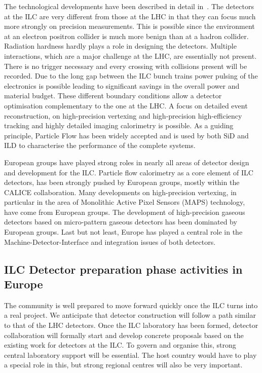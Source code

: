 \documentclass[%
 reprint,
 floatfix,
 amsmath,amssymb,
 aps,
]{revtex4-1}
\begin{document}
The technological developments have been described in detail in~\cite{ILCforESS}. 
The detectors at the ILC are very different from those at the LHC in that they 
can focus much more strongly on precision measurements. This is possible since 
the environment at an electron positron collider is much more benign than at a 
hadron collider. Radiation hardness hardly plays a role in designing the 
detectors. Multiple interactions, which are a major challenge at the LHC, are 
essentially not present. There is no trigger necessary and every crossing with collisions present will be recorded. Due to the long gap between the ILC bunch trains power pulsing of the electronics is possible leading to significant savings in the overall power and material budget.
These different boundary conditions allow a detector 
optimisation complementary to the one at the LHC. A focus on detailed event 
reconstruction, on high-precision vertexing and high-precision high-efficiency 
tracking and highly detailed imaging calorimetry is possible. As a guiding 
principle, Particle Flow has been widely accepted and is used by both SiD and ILD 
to characterise the performance of the complete systems. 

European groups have played strong roles in nearly all areas of detector design 
and development for the ILC. Particle flow calorimetry as a core element of ILC detectors,  
has been strongly pushed by European groups, mostly within the CALICE collaboration. Many developments on 
high-precision vertexing, in particular in the area of Monolithic Active Pixel 
Sensors (MAPS) technology, have come from European groups. The development of 
high-precision gaseous detectors based on micro-pattern gaseous detectors has 
been dominated by European groups. Last but not least, Europe has played a 
central role in the Machine-Detector-Interface and integration issues of 
both detectors.

\subsection{ILC Detector preparation phase activities in Europe~\label{sec:det:prepphase}}
The community is well prepared to move forward quickly once the ILC turns into a 
real project. We anticipate that detector construction will follow a path 
similar to that of the LHC detectors. Once the ILC laboratory has been formed, 
detector collaboration will formally start and develop concrete proposals based on the existing 
work for detectors at the ILC. To govern and organise this,  
strong central laboratory support will be essential. The host country would have 
to play a special role in this, but strong regional centres will also be very 
important. 
\end{document}
